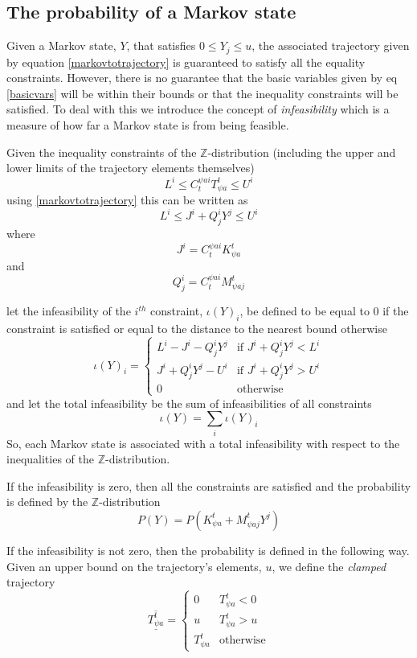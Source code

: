 \documentclass{article}
\begin{document}
\subsection{The probability of a Markov state}

Given a Markov state, $Y$, that satisfies $0 \le Y_j \le u$, the associated trajectory given by equation \eqref{markovtotrajectory} is guaranteed to satisfy all the equality constraints. However, there is no guarantee that the basic variables given by eq \eqref{basicvars} will be within their bounds or that the inequality constraints will be satisfied. To deal with this we introduce the concept of \textit{infeasibility} which is a measure of how far a Markov state is from being feasible.

Given the inequality constraints of the $\mathbb{Z}$-distribution (including the upper and lower limits of the trajectory elements themselves)
\[
L^i \le C^{\psi ai}_{t} T^t_{\psi a} \le U^i
\]
using \eqref{markovtotrajectory} this can be written as
\begin{equation}
L^i \le J^i + Q_j^i Y^j \le U^i
\label{ineqconstraints}
\end{equation}
where
\[
J^i = C^{\psi ai}_{t} K^t_{\psi a}
\]
and
\[
Q_j^i = C^{\psi ai}_{t}M^{t}_{\psi aj}
\]

let the infeasibility of the $i^{th}$ constraint, $\iota(Y)_i$, be defined to be equal to 0 if the constraint is satisfied or equal to the distance to the nearest bound otherwise
\[
\iota(Y)_i =
\begin{cases}
L^i- J^i - Q_j^iY^j & \text{if }J^i + Q_j^iY^j<L^i\\
J^i + Q_j^iY^j-U^i & \text{if }J^i + Q_j^iY^j>U^i\\
0 & \text{otherwise}
\end{cases}
\]
and let the total infeasibility be the sum of infeasibilities of all constraints
\[
\iota(Y) = \sum_i \iota(Y)_i
\]
So, each Markov state is associated with a total infeasibility with respect to the inequalities of the $\mathbb{Z}$-distribution. 

If the infeasibility is zero, then all the constraints are satisfied and the probability is defined by the $\mathbb{Z}$-distribution
\[
P(Y) = P(K^t_{\psi a} + M^{t}_{\psi aj}Y^j)
\]

If the infeasibility is not zero, then the probability is defined in the following way. Given an upper bound on the trajectory's elements, $u$, we define the \textit{clamped} trajectory
\[
\overline{\underline{T^t_{\psi a}}} = 
\begin{cases}
0 & T^t_{\psi a}<0\\
u & T^t_{\psi a}>u\\
T^t_{\psi a} & \text{otherwise}
\end{cases}
\]
\end{document}
